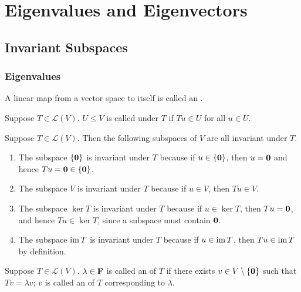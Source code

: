 \chapter{Eigenvalues and Eigenvectors}
\section{Invariant Subspaces}
\subsection{Eigenvalues}
\begin{definition}[Operator]
A linear map from a vector space to itself is called an .
\end{definition}

\begin{definition}
Suppose $T\in\mathcal{L}(V)$. $U\le V$ is called  under $T$ if $Tu\in U$ for all $u\in U$.
\end{definition}

\begin{example}
Suppose $T\in\mathcal{L}(V)$. Then the following subspaces of $V$ are all invariant under $T$.
\begin{enumerate}[label=(\roman*)]
\item The subspace $\{\vb{0}\}$ is invariant under $T$ because if $u\in\{\vb{0}\}$, then $u=\vb{0}$ and hence $Tu=\vb{0}\in\{\vb{0}\}$.
\item The subspace $V$ is invariant under $T$ because if $u\in V$, then $Tu\in V$. 
\item The subspace $\ker T$ is invariant under $T$ because if $u\in\ker T$, then $Tu=\vb{0}$, and hence $Tu\in\ker T$, since a subspace must contain $\vb{0}$.
\item The subspace $\operatorname{im} T$ is invariant under $T$ because if $u\in\operatorname{im} T$, then $Tu\in\operatorname{im} T$ by definition.
\end{enumerate}
\end{example}

\begin{definition}
Suppose $T\in\mathcal{L}(V)$. $\lambda\in\mathbf F$ is called an  of $T$ if there exists $v\in V\setminus\{\vb{0}\}$ such that $Tv=\lambda v$; $v$ is called an  of $T$ corresponding to $\lambda$.
\end{definition}

